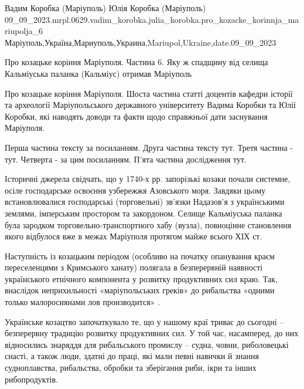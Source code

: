  
 
 
 
 

Вадим Коробка (Маріуполь)
Юлія Коробка (Маріуполь)
09_09_2023.mrpl.0629.vadim_korobka.julia_korobka.pro_kozacke_korinnja_mariupolja_6
Маріуполь,Україна,Мариуполь,Украина,Mariupol,Ukraine,date.09_09_2023

Про козацьке коріння Маріуполя. Частина 6. Яку ж спадщину від селища Кальміуська паланка (Кальміус) отримав Маріуполь

Про козацьке коріння Маріуполя. Шоста частина статті доцентів кафедри історії
та археології Маріупольського державного університету Вадима Коробки та Юлії
Коробки, які наводять доводи та факти щодо справжньої дати заснування
Маріуполя. 

Перша частина тексту за посиланням. Друга частина тексту тут. Третя частина -
тут. Четверта - за цим посиланням. П'ята частина дослідження тут.

Історичні джерела свідчать, що у 1740-х рр. запорізькі козаки почали системне,
осіле господарське освоєння узбережжя Азовського моря. Завдяки цьому
встановлювалися господарські (торговельні) зв’язки Надазов’я з українськими
землями, імперським простором та закордоном. Селище Кальміуська паланка була
зародком торговельно-транспортного хабу (вузла), повноцінне становлення якого
відбулося вже в межах Маріуполя протягом майже всього ХІХ ст. 

Наступність із козацьким періодом (особливо на початку опанування краєм
переселенцями з Кримського ханату) полягала в безперервній наявності
українського етнічного компонента у розвитку продуктивних сил краю. Так,
внаслідок неприхильності «маріупольських греків» до рибальства «одними только
малоросиянами лов производится» .

Українське козацтво започаткувало те, що у нашому краї триває до сьогодні –
безперервну традицію розвитку продуктивних сил. У той час,  насамперед, до них
відносились знаряддя для рибальського промислу – судна, човни, риболовецькі
снасті, а також люди, здатні до праці, які мали певні навички й знання
судноплавства, рибальства, обробки та зберігання риби, ікри та інших
рибопродуктів.

